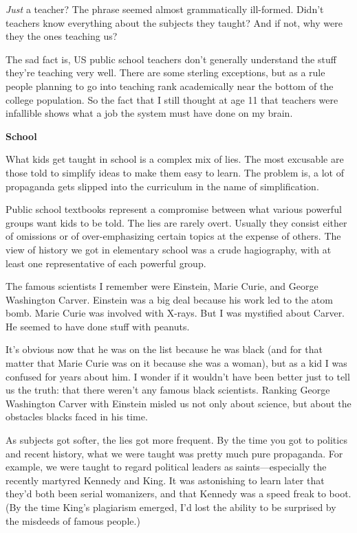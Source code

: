 \emph{Just} a teacher? The phrase seemed almost grammatically
ill-formed. Didn't teachers know everything about the subjects they
taught? And if not, why were they the ones teaching us?

The sad fact is, US public school teachers don't generally understand
the stuff they're teaching very well. There are some sterling
exceptions, but as a rule people planning to go into teaching rank
academically near the bottom of the college population. So the fact that
I still thought at age 11 that teachers were infallible shows what a job
the system must have done on my brain.

\textbf{School}

What kids get taught in school is a complex mix of lies. The most
excusable are those told to simplify ideas to make them easy to learn.
The problem is, a lot of propaganda gets slipped into the curriculum in
the name of simplification.

Public school textbooks represent a compromise between what various
powerful groups want kids to be told. The lies are rarely overt. Usually
they consist either of omissions or of over-emphasizing certain topics
at the expense of others. The view of history we got in elementary
school was a crude hagiography, with at least one representative of each
powerful group.

The famous scientists I remember were Einstein, Marie Curie, and George
Washington Carver. Einstein was a big deal because his work led to the
atom bomb. Marie Curie was involved with X-rays. But I was mystified
about Carver. He seemed to have done stuff with peanuts.

It's obvious now that he was on the list because he was black (and for
that matter that Marie Curie was on it because she was a woman), but as
a kid I was confused for years about him. I wonder if it wouldn't have
been better just to tell us the truth: that there weren't any famous
black scientists. Ranking George Washington Carver with Einstein misled
us not only about science, but about the obstacles blacks faced in his
time.

As subjects got softer, the lies got more frequent. By the time you got
to politics and recent history, what we were taught was pretty much pure
propaganda. For example, we were taught to regard political leaders as
saints---especially the recently martyred Kennedy and King. It was
astonishing to learn later that they'd both been serial womanizers, and
that Kennedy was a speed freak to boot. (By the time King's plagiarism
emerged, I'd lost the ability to be surprised by the misdeeds of famous
people.)

